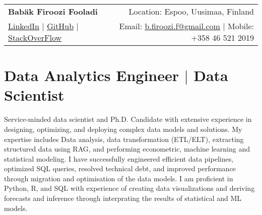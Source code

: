 \documentclass[a4paper,11pt]{article}
\begin{document}
	
	
	
	
	\begin{tabular*}{\textwidth}{l@{\extracolsep{\fill}}r}
		\textbf{\Huge Babäk Firoozi Fooladi \vspace{2pt}} & %
		Location: Espoo, Uusimaa, Finland \\ %
		\href{https://www.linkedin.com/in/babak-firoozi-fooladi/}{\uline{LinkedIn}} $|$ %
		\href{https://github.com/Babakfifoo}{\uline{GitHub}} $|$ %
		\href{https://stackoverflow.com/users/5116559/babak-fi-foo}{\uline{StackOverFlow}} & %
		Email: \href{mailto:b.firoozi.f@gmail.com}{\uline{b.firoozi.f@gmail.com}} $|$ %
		Mobile: +358 46 521 2019 \\ %
	\end{tabular*}
	
	
	
	\section{Data Analytics Engineer $|$ Data Scientist}
	\small{
		Service-minded data scientist and Ph.D. Candidate with extensive experience in designing, optimizing, and deploying complex data models and solutions. My expertise includes Data analysis, data transformation (ETL/ELT), extracting structured data using RAG, and performing econometric, machine learning and statistical modeling. I have successfully engineered efficient data pipelines, optimized SQL queries, resolved technical debt, and improved performance through migration and optimisation of the data models. I am proficient in Python, R, and SQL with experience of creating data visualizations and deriving forecasts and inference through interprating the results of statistical and ML models.
	}
	
\end{document}
